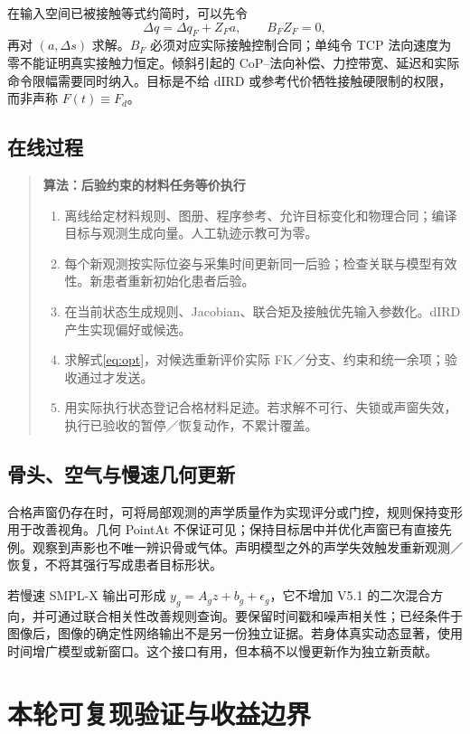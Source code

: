 \documentclass[UTF8,11pt,a4paper,fontset=fandol]{ctexart}
\numberwithin{equation}{section}
\theoremstyle{definition}
\begin{document}
在输入空间已被接触等式约简时，可以先令
\begin{equation}
 \Delta q=\Delta q_F+Z_F a,\qquad B_F Z_F=0,
 \label{eq:contact}
\end{equation}
再对 $(a,\Delta s)$ 求解。$B_F$ 必须对应实际接触控制合同；单纯令 TCP 法向速度为零不能证明真实接触力恒定。倾斜引起的 CoP--法向补偿、力控带宽、延迟和实际命令限幅需要同时纳入。目标是不给 dIRD 或参考代价牺牲接触硬限制的权限，而非声称 $F(t)\equiv F_d$。

\subsection{在线过程}
\begin{quote}\small
\textbf{算法：后验约束的材料任务等价执行}
\begin{enumerate}
\item 离线给定材料规则、图册、程序参考、允许目标变化和物理合同；编译目标与观测生成向量。人工轨迹示教可为零。
\item 每个新观测按实际位姿与采集时间更新同一后验；检查关联与模型有效性。新患者重新初始化患者后验。
\item 在当前状态生成规则、Jacobian、联合矩及接触优先输入参数化。dIRD 产生实现偏好或候选。
\item 求解式\eqref{eq:opt}，对候选重新评价实际 FK／分支、约束和统一余项；验收通过才发送。
\item 用实际执行状态登记合格材料足迹。若求解不可行、失锁或声窗失效，执行已验收的暂停／恢复动作，不累计覆盖。
\end{enumerate}
\end{quote}

\subsection{骨头、空气与慢速几何更新}
合格声窗仍存在时，可将局部观测的声学质量作为实现评分或门控，规则保持变形用于改善视角。几何 PointAt 不保证可见；保持目标居中并优化声窗已有直接先例\cite{chatelain}。观察到声影也不唯一辨识骨或气体。声明模型之外的声学失效触发重新观测／恢复，不将其强行写成患者目标形状。

若慢速 SMPL-X 输出可形成 $y_g=A_gz+b_g+\epsilon_g$，它不增加 V5.1 的二次混合方向，并可通过联合相关性改善规则查询。要保留时间戳和噪声相关性；已经条件于图像后，图像的确定性网络输出不是另一份独立证据。若身体真实动态显著，使用时间增广模型或新窗口。这个接口有用，但本稿不以慢更新作为独立新贡献。

\section{本轮可复现验证与收益边界}
\label{sec:exp}
\end{document}
